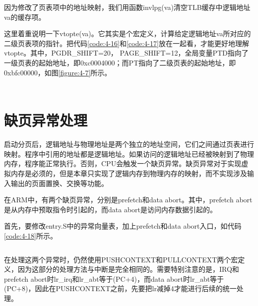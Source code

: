 \documentclass[main.tex]{subfiles}
\begin{document}
\begin{CJK*}{UTF8}{song}
\noindent
因为修改了页表项中的地址映射，我们用函数invlpg(va)清空TLB缓存中逻辑地址va的缓存项。

\par
这里着重说明一下vtopte(va)。它其实是个宏定义，计算给定逻辑地址va所对应的二级页表项的指针。把代码\ref{code:4-16}和\ref{code:4-17}放在一起看，才能更好地理解vtopte。其中，PGDR\_SHIFT=20， PAGE\_SHIFT=12，全局变量PTD指向了一级页表的起始地址，即0xc0004000；而PT指向了二级页表的起始地址，即0xbfc00000，如图\ref{figure:4-7}所示。

\begin{code}
\label{code:4-16}
\inputminted[firstline=38,lastline=48,linenos,numbersep=5pt,frame=lines,framesep=2mm]{c}{src/chapter04/kernel/kernel.h}
\end{code}

\begin{code}
\label{code:4-17}
\inputminted[firstline=13,lastline=14,linenos,numbersep=5pt,frame=lines,framesep=2mm]{c}{src/chapter04/kernel/kernel.c}
\end{code}

\section{缺页异常处理}\label{section:page-fault}
启动分页后，逻辑地址与物理地址是两个独立的地址空间，它们之间通过页表进行映射。程序中引用的地址都是逻辑地址。如果访问的逻辑地址已经被映射到了物理内存，程序能正常执行。否则，CPU会触发一个缺页异常。缺页异常对于实现虚拟内存是必须的，但是本章只实现了逻辑内存到物理内存的映射，而不实现涉及输入输出的页面置换、交换等功能。

\par
在ARM中，有两个缺页异常，分别是prefetch和data abort。其中，prefetch abort是从内存中预取指令时引起的，而data abort是访问内存数据引起的。

\par
首先，要修改entry.S中的异常向量表，加上prefetch和data abort入口，如代码\ref{code:4-18}所示。

\begin{code}
\label{code:4-18}
\inputminted[firstline=91,lastline=106,linenos,numbersep=5pt,frame=lines,framesep=2mm]{gas}{src/chapter04/kernel/entry.S}
\end{code}

在处理这两个异常时，仍然使用PUSHCONTEXT和PULLCONTEXT两个宏定义，因为这部分的处理方法与中断是完全相同的。需要特别注意的是，IRQ和prefetch abort时lr\_irq和lr\_abt等于(PC+4)，而data abort时lr\_abt等于(PC+8)，因此在PUSHCONTEXT之前，先要把lr减掉4才能进行后续的统一处理。


\end{CJK*}
\end{document}
